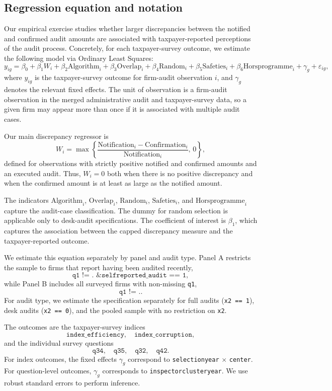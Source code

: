 \subsection{Regression equation and notation}

Our empirical exercise studies whether larger discrepancies between the notified and confirmed audit amounts are associated with taxpayer-reported perceptions of the audit process. Concretely, for each taxpayer-survey outcome, we estimate the following model via Ordinary Least Squares:
\[
y_{ig}
=
\beta_0
+ \beta_1 W_i
+ \beta_2 \text{Algorithm}_i
+ \beta_3 \text{Overlap}_i
+ \beta_4 \text{Random}_i
+ \beta_5 \text{Safeties}_i
+ \beta_6 \text{Horsprogramme}_i
+ \gamma_g
+ \varepsilon_{ig},
\]
where \(y_{ig}\) is the taxpayer-survey outcome for firm-audit observation \(i\), and \(\gamma_g\) denotes the relevant fixed effects. The unit of observation is a firm-audit observation in the merged administrative audit and taxpayer-survey data, so a given firm may appear more than once if it is associated with multiple audit cases.

Our main discrepancy regressor is
\[
W_i
=
\max\left\{
\frac{\text{Notification}_i-\text{Confirmation}_i}{\text{Notification}_i},
\,0
\right\},
\]
defined for observations with strictly positive notified and confirmed amounts and an executed audit. Thus, \(W_i=0\) both when there is no positive discrepancy and when the confirmed amount is at least as large as the notified amount.

The indicators \(\text{Algorithm}_i\), \(\text{Overlap}_i\), \(\text{Random}_i\), \(\text{Safeties}_i\), and \(\text{Horsprogramme}_i\) capture the audit-case classification. The dummy for random selection is applicable only to desk-audit specifications. The coefficient of interest is \(\beta_1\), which captures the association between the capped discrepancy measure and the taxpayer-reported outcome.

We estimate this equation separately by panel and audit type. Panel A restricts the sample to firms that report having been audited recently,
\[
\texttt{q1 != . \& selfreported\_audit == 1},
\]
while Panel B includes all surveyed firms with non-missing \texttt{q1},
\[
\texttt{q1 != .}.
\]
For audit type, we estimate the specification separately for full audits (\texttt{x2 == 1}), desk audits (\texttt{x2 == 0}), and the pooled sample with no restriction on \texttt{x2}.

The outcomes are the taxpayer-survey indices
\[
\texttt{index\_efficiency}, \quad \texttt{index\_corruption},
\]
and the individual survey questions
\[
\texttt{q34}, \quad \texttt{q35}, \quad \texttt{q32}, \quad \texttt{q42}.
\]
For index outcomes, the fixed effects \(\gamma_g\) correspond to \texttt{selectionyear} \(\times\) \texttt{center}. For question-level outcomes, \(\gamma_g\) corresponds to \texttt{inspectorclusteryear}. We use robust standard errors to perform inference.

